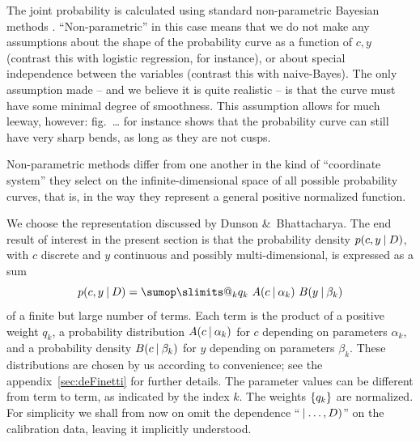 \documentclass[\ifafour a4paper,12pt,\else a5paper,10pt,\fi%
onecolumn,oneside,article,%
british%
]{memoir}
\makeatletter
\theoremstyle{remark}
\theoremstyle{innote}
\def\sum{\DOTSI\sumop\slimits@}
\newcommand*{\amp}{\&}
\newcommand*{\pencil}{{\fontencoding{U}\fontfamily{fontawesometwo}\selectfont\symbol{210}}}
\newcommand{\mynotep}[1]{{\footnotesize\color{notecolour}\pencil\ #1}}
\DeclarePairedDelimiter\set{\{}{\}} %
\renewcommand*{\|}[1][]{\nonscript\:#1\vert\nonscript\:\mathopen{}}
\newcommand*{\fig}{fig.}%
\newcommand*{\eg}{{e.g.}}
\makeatother
\begin{document}
The joint probability is calculated using standard non-parametric Bayesian methods \autocites[for introductions and reviews see \eg][]{walker2013,muelleretal2004b,hjort1996}. \enquote{Non-parametric} in this case means that we do not make any assumptions about the shape of the probability curve as a function of $c,y$ (contrast this with logistic regression, for instance), or about special independence between the variables (contrast this with naive-Bayes). The only assumption made -- and we believe it is quite realistic -- is that the curve must have some minimal degree of smoothness. This assumption allows for much leeway, however: \fig\mynotep{\ldots} for instance shows that the probability curve can still have very sharp bends, as long as they are not cusps.

Non-parametric methods differ from one another in the kind of \enquote{coordinate system} they select on the infinite-dimensional space of all possible probability curves, that is, in the way they represent a general positive normalized function.

We choose the representation discussed by Dunson \amp\ Bhattacharya\autocites{dunsonetal2011}[see also the special case presented by][]{rasmussen1999}. The end result of interest in the present section is that the probability density $p(c,y \| D)$, with $c$ discrete and $y$ continuous and possibly multi-dimensional, is expressed as a sum
\begin{equation}
  \label{eq:representation_P}
  p(c, y \| D) = \sum_{k} q_{k}\ A(c \| \alpha_{k})\ B(y \| \beta_{k})
\end{equation}
of a finite but large number of terms. Each term is the product of a positive weight $q_{k}$, a probability distribution $A(c \| \alpha_{k})$ for $c$ depending on parameters $\alpha_{k}$, and a probability density $B(c \| \beta_{k})$ for $y$ depending on parameters $\beta_{k}$. These distributions are chosen by us according to convenience; see the appendix~\ref{sec:deFinetti} for further details. The parameter values can be different from term to term, as indicated by the index $k$. The weights $\set{q_{k}}$ are normalized. For simplicity we shall from now on omit the dependence \enquote{$\|\dotsc, D)$} on the calibration data, leaving it implicitly understood.
\end{document}
